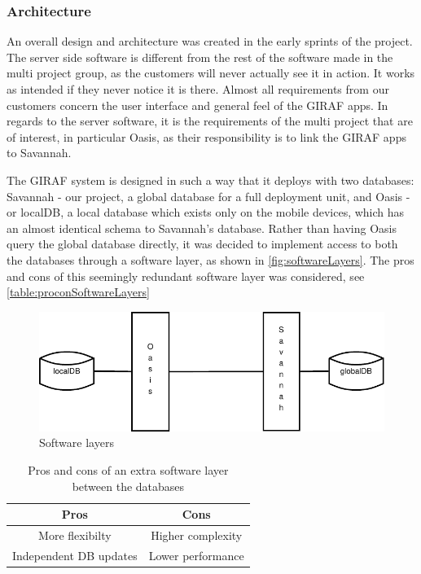 \subsubsection*{Architecture}
An overall design and architecture was created in the early sprints of the project.
 The server side software is different from the rest of the software made in the multi project group, as the customers will never actually see it in action. It works as intended if they never notice it is there.
Almost all requirements from our customers concern the user interface and general feel of the GIRAF apps. In regards to the server software, it is the requirements of the multi project that are of interest,
in particular Oasis, as their responsibility is to link the GIRAF apps to Savannah.

The GIRAF system is designed in such a way that it deploys with two databases: Savannah - our project, a global database for a full deployment unit, and Oasis - or localDB, a local database which exists only
on the mobile devices, which has an almost identical schema to Savannah's database.
Rather than having Oasis query the global database directly, it was decided to implement access to both the databases through a software layer, as shown in \autoref{fig:softwareLayers}.
The pros and cons of this seemingly redundant software layer was considered, see \autoref{table:proconSoftwareLayers}

\begin{figure}[H]
	\centering
		\includegraphics[scale=1]{images/softwareLayers}
	\caption{Software layers}
	\label{fig:softwareLayers}
\end{figure}

\begin{table}[H]
  \begin{center}
    \begin{tabular}{c|c}
    Pros                   &             Cons \\
    \hline
    More flexibilty        & Higher complexity\\
    Independent DB updates & Lower performance\\
    \end{tabular}
    \caption{Pros and cons of an extra software layer between the databases}
    \label{table:proconSoftwareLayers}
  \end{center}
\end{table}

